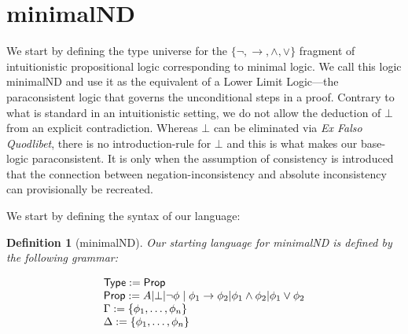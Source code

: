 \documentclass[]{article}
\newtheorem{definition}{Definition}
\begin{document}



\section{{\sf minimalND}}\label{sec:lower}

We start by defining the type universe for the $\{\neg, \rightarrow, \wedge, \vee\}$ fragment of intuitionistic propositional logic corresponding to minimal logic. We call this logic {\sf minimalND} and use it as the equivalent of a Lower Limit Logic---the paraconsistent logic that governs the unconditional steps in a proof. Contrary to what is standard in an intuitionistic setting, we do not allow the deduction of $\bot$ from an explicit contradiction. Whereas $\bot$ can be eliminated via \emph{Ex Falso Quodlibet}, there is no introduction-rule for $\bot$ and this is what makes our base-logic paraconsistent. It is only when the assumption of consistency is introduced that the connection between negation-inconsistency and absolute inconsistency can provisionally be recreated.

We start by defining the syntax of our language:

\begin{definition}[{\sf minimalND}]

 Our starting language for {\sf minimalND} is defined by the following grammar:
 
\begin{displaymath}
\begin{array}{l}
{\sf Type}:={\sf Prop}\\
{\sf Prop}:= A | \bot | \neg \phi \mid \phi_{1} \rightarrow \phi_{2} | \phi_{1} \wedge \phi_{2} | \phi_{1} \vee \phi_{2}\\
\Gamma := \{\phi_{1}, \dots, \phi_{n}\}\\
\Delta := \{\phi_{1}, \dots, \phi_{n}\}

\end{array}
\end{displaymath}
\end{definition}
\end{document}
